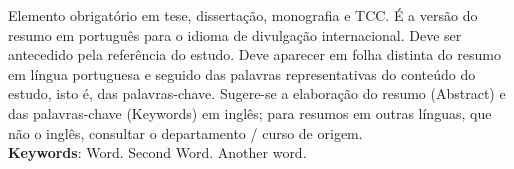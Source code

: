 
\begin{resumo}[ABSTRACT]
\begin{SingleSpacing}


Elemento obrigatório em tese, dissertação, monografia e TCC. É a versão do resumo em português para o idioma de divulgação internacional. Deve ser antecedido pela referência do estudo. Deve aparecer em folha distinta do resumo em língua portuguesa e seguido das palavras representativas do conteúdo do estudo, isto é, das palavras-chave. Sugere-se a elaboração do resumo (Abstract) e das palavras-chave (Keywords) em inglês; para resumos em outras línguas, que não o inglês, consultar o departamento / curso de origem.\\

\textbf{Keywords}: Word. Second Word. Another word.

\end{SingleSpacing}
\end{resumo}

